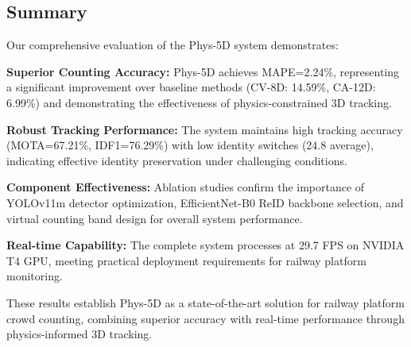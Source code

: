 \subsection{Summary}

Our comprehensive evaluation of the Phys-5D system demonstrates:

\textbf{Superior Counting Accuracy:} Phys-5D achieves MAPE=2.24\%, representing a significant improvement over baseline methods (CV-8D: 14.59\%, CA-12D: 6.99\%) and demonstrating the effectiveness of physics-constrained 3D tracking.

\textbf{Robust Tracking Performance:} The system maintains high tracking accuracy (MOTA=67.21\%, IDF1=76.29\%) with low identity switches (24.8 average), indicating effective identity preservation under challenging conditions.

\textbf{Component Effectiveness:} Ablation studies confirm the importance of YOLOv11m detector optimization, EfficientNet-B0 ReID backbone selection, and virtual counting band design for overall system performance.

\textbf{Real-time Capability:} The complete system processes at 29.7 FPS on NVIDIA T4 GPU, meeting practical deployment requirements for railway platform monitoring.

These results establish Phys-5D as a state-of-the-art solution for railway platform crowd counting, combining superior accuracy with real-time performance through physics-informed 3D tracking.
